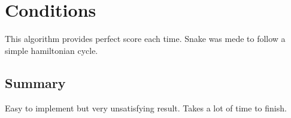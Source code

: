 \section{Conditions}
\label{sec:conditions}

This algorithm provides perfect score each time. Snake was mede to follow a simple hamiltonian cycle.

\subsection{Summary}

Easy to implement but very unsatisfying result. Takes a lot of time to finish.
